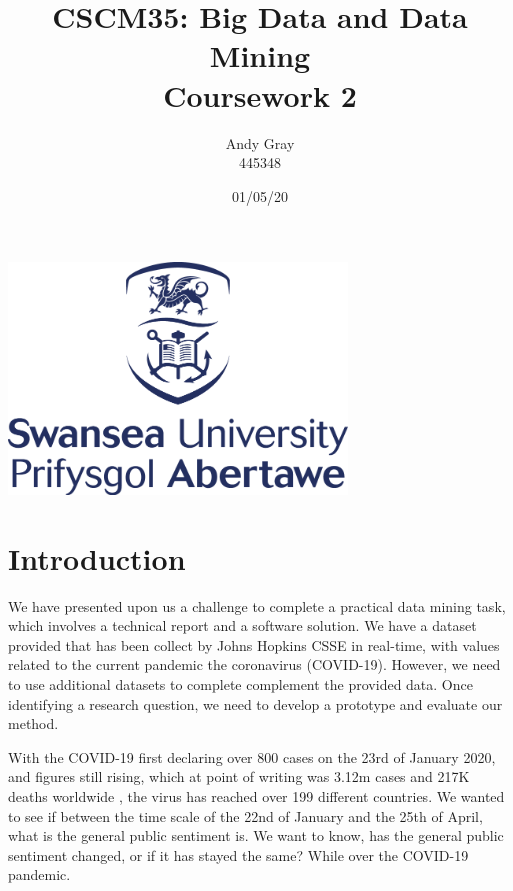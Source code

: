 \documentclass[a4paper,10pt]{article}
\begin{document}
\title{\textbf{CSCM35: Big Data and Data Mining \\Coursework 2}}
\date{01/05/20}
\author{Andy Gray\\445348}




\maketitle
\begin{center}
\item\includegraphics[width=9cm]{swansea.png}
\end{center}

\thispagestyle{empty}
\newpage
{}

\section{Introduction}

We have presented upon us a challenge to complete a practical data mining task, which involves a technical report and a software solution. We have a dataset provided that has been collect by Johns Hopkins CSSE in real-time, with values related to the current pandemic the coronavirus (COVID-19). However, we need to use additional datasets to complete complement the provided data. Once identifying a research question, we need to develop a prototype and evaluate our method. 

With the COVID-19 first declaring over 800 cases on the 23rd of January 2020, and figures still rising, which at point of writing was 3.12m cases and 217K deaths worldwide \cite{worldmeter}, the virus has reached over 199 different countries. We wanted to see if between the time scale of the 22nd of January and the 25th of April, what is the general public sentiment is. We want to know, has the general public sentiment changed, or if it has stayed the same? While over the COVID-19 pandemic.
\end{document}
